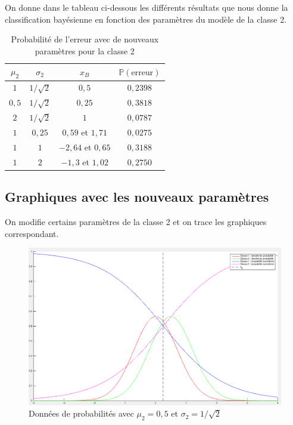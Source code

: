 \documentclass[11pt,a4paper]{article}
\begin{document}
On donne dans le tableau ci-dessous les différents résultats que nous donne la classification bayésienne en fonction des paramètres du modèle de la classe 2.
\begin{table}[H]
\center
\begin{tabular}{|c|c|c|c|}
\hline 
$\mu_2$ & $\sigma_2$ & $x_B$ & $\mathbb{P}(\text{erreur})$ \\ 
\hline 
$1$ & $1/ \sqrt{2}$ & $0,5$ & $0,2398$ \\ 
\hline 
$0,5$ & $1/ \sqrt{2}$ & $0,25$ & $0,3818$ \\ 
\hline 
$2$ & $1/ \sqrt{2}$ & $1$ & $0,0787$ \\ 
\hline 
$1$ & $0,25$ & $0,59$ et $1,71$ & $0,0275$ \\ 
\hline 
$1$ & $1$ & $-2,64$ et $0,65$ & $0,3188$ \\ 
\hline 
$1$ & $2$ & $-1,3$ et $1,02$ & $0,2750$ \\ 
\hline 
\end{tabular}
\caption{Probabilité de l'erreur avec de nouveaux paramètres pour la classe 2}

\end{table}


\subsection{Graphiques avec les nouveaux paramètres}
On modifie certains paramètres de la classe 2 et on trace les graphiques correspondant.

\begin{figure}[H]
\center
\includegraphics[width=14cm]{exo1_graph_mu05.png}
\caption{Données de probabilités avec $\mu_2 = 0,5$ et $\sigma_2 = 1/\sqrt{2}$}
\end{figure}
\end{document}
